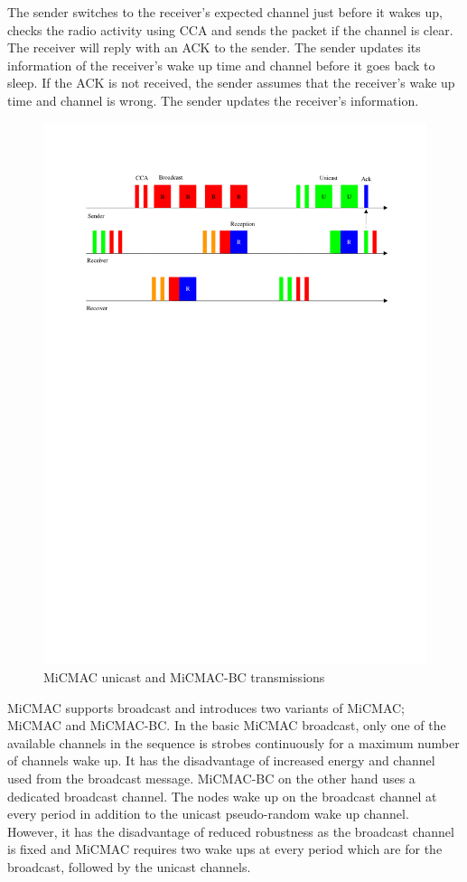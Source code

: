 The sender switches to the receiver's expected channel just before it wakes up, checks the radio activity using CCA and sends the packet if the channel is clear. The receiver will reply with an ACK to the sender. The sender updates its information of the receiver's wake up time and channel before it goes back to sleep. If the ACK is not received, the sender assumes that the receiver's wake up time and channel is wrong. The sender updates the receiver's information. 

\begin{figure}
\centering
\includegraphics[trim=2cm 19cm 1cm 2cm, clip=true, totalheight=0.30\textheight]{micmac.pdf}
\caption{MiCMAC unicast and MiCMAC-BC transmissions}
\label{fig_micmac}
\end{figure}

MiCMAC supports broadcast and introduces two variants of MiCMAC; MiCMAC and MiCMAC-BC. In the basic MiCMAC broadcast, only one of the available channels in the sequence is strobes continuously for a maximum number of channels wake up. It has the disadvantage of increased energy and channel used from the broadcast message. MiCMAC-BC on the other hand uses a dedicated broadcast channel. The nodes wake up on the broadcast channel at every period in addition to the unicast pseudo-random wake up channel. However, it has the disadvantage of reduced robustness as the broadcast channel is fixed and MiCMAC requires two wake ups at every period which are for the broadcast, followed by the unicast channels. 

